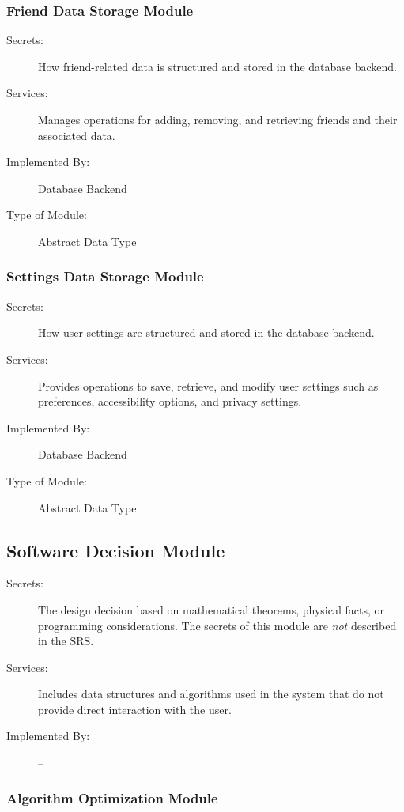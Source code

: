 \documentclass[12pt, titlepage]{article}
\begin{document}
\subsubsection{Friend Data Storage Module}

\begin{description}
\item[Secrets:] How friend-related data is structured and stored in the database backend.
\item[Services:] Manages operations for adding, removing, and retrieving friends and their associated data.
\item[Implemented By:] Database Backend
\item[Type of Module:] Abstract Data Type
\end{description}

\subsubsection{Settings Data Storage Module}

\begin{description}
\item[Secrets:] How user settings are structured and stored in the database backend.
\item[Services:] Provides operations to save, retrieve, and modify user settings such as preferences, accessibility options, and privacy settings.
\item[Implemented By:] Database Backend
\item[Type of Module:] Abstract Data Type
\end{description}

\subsection{Software Decision Module}

\begin{description}
\item[Secrets:] The design decision based on mathematical theorems, physical facts, or programming considerations. The secrets of this module are \emph{not} described in the SRS.
\item[Services:] Includes data structures and algorithms used in the system that do not provide direct interaction with the user.
\item[Implemented By:] --
\end{description}

\subsubsection{Algorithm Optimization Module}
\end{document}
